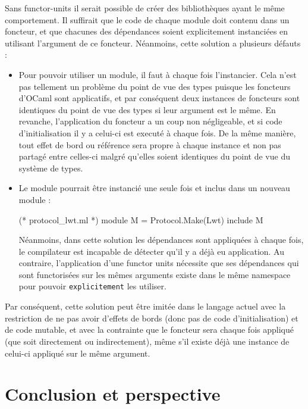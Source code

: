 \documentclass[11pt,a4paper]{report}
\begin{document}
Sans functor-units il serait possible de créer des bibliothèques ayant le même
comportement. Il suffirait que le code de chaque module doit contenu dans un
foncteur, et que chacunes des dépendances soient explicitement instanciées en
utilisant l'argument de ce foncteur. Néanmoins, cette solution a plusieurs
défauts :
\begin{itemize}
\item Pour pouvoir utiliser un module, il faut à chaque fois l'instancier. Cela
  n'est pas tellement un problème du point de vue des types puisque les
  foncteurs d'OCaml sont applicatifs, et par conséquent deux instances de
  foncteurs sont identiques du point de vue des types si leur argument est le
  même. En revanche, l'application du foncteur a un coup non négligeable, et si
  code d'initialisation il y a celui-ci est executé à chaque fois. De la même
  manière, tout effet de bord ou référence sera propre à chaque instance et non
  pas partagé entre celles-ci malgré qu'elles soient identiques du point de vue
  du système de types.
\item Le module pourrait être instancié une seule fois et inclus dans un nouveau
  module :
\begin{OCaml}
(* protocol_lwt.ml *)
module M = Protocol.Make(Lwt)
include M
\end{OCaml}
Néanmoins, dans cette solution les dépendances sont appliquées à chaque fois, le
compilateur est incapable de détecter qu'il y a déjà eu application. Au
contraire, l'application d'une functor units nécessite que ses dépendances qui
sont functorisées sur les mêmes arguments existe dans le même namespace pour
pouvoir \texttt{explicitement} les utiliser. 
\end{itemize}

Par conséquent, cette solution peut être imitée dans le langage actuel avec la
restriction de ne pas avoir d'effets de bords (donc pas de code
d'initialisation) et de code mutable, et avec la contrainte que le foncteur sera
chaque fois appliqué (que soit directement ou indirectement), même s'il existe
déjà une instance de celui-ci appliqué sur le même argument.

\chapter{Conclusion et perspective}
\end{document}
